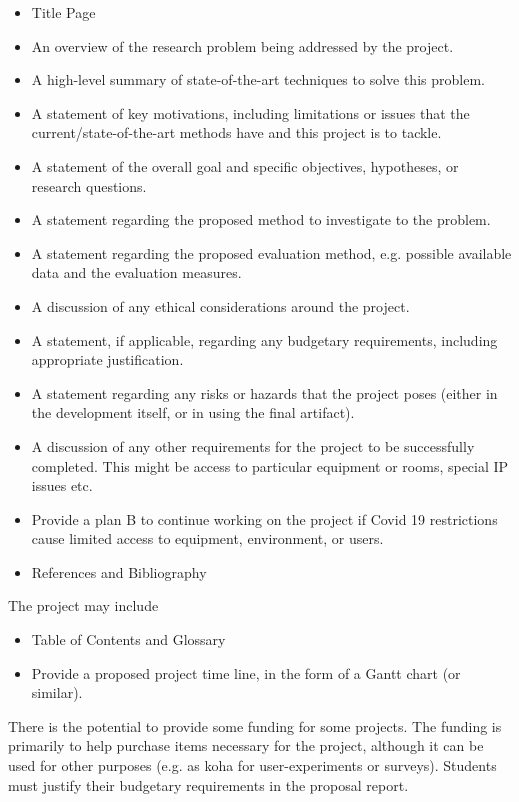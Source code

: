 \begin{itemize}
    \item Title Page
    \item An overview of the research problem being addressed by the project.
    \item A high-level summary of state-of-the-art techniques to solve this problem.
    \item A statement of key motivations, including limitations or issues that the current/state-of-the-art methods have and this project is to tackle.
    \item A statement of the overall goal and specific objectives, hypotheses, or research questions.
    \item A statement regarding the proposed method to investigate to the problem.
    \item A statement regarding the proposed evaluation method, e.g. possible available data and the evaluation measures.
    \item A discussion of any ethical considerations around the project.
    \item A statement, if applicable, regarding any budgetary requirements, including
      appropriate justification.
    \item A statement regarding any risks or hazards that the project
      poses (either in the development itself, or in using the final
      artifact).
    \item A discussion of any other requirements for the project to be successfully
    completed. This might be access to particular equipment or rooms, special IP
    issues etc.
    \item Provide a plan B to continue working on the project if Covid 19 restrictions cause limited access to equipment, environment, or users.
\item References and Bibliography
\end{itemize}

The project may include
\begin{itemize}
	\item Table of Contents and Glossary
    \item Provide a proposed project time line, in the form of a Gantt chart (or similar).
\end {itemize}

There is the potential to provide some funding for some projects.  
The funding is primarily to help purchase items
necessary for the project, although it can be used for other purposes
(e.g. as koha for user-experiments or surveys).  Students must justify their
budgetary requirements in the proposal report.

